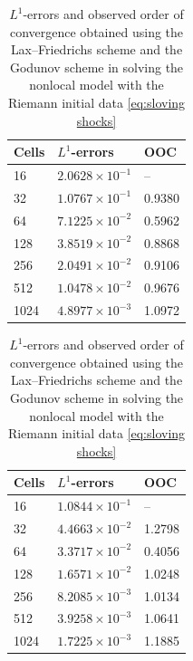 \begin{table}[H]
    \centering
    \begin{minipage}{0.45\textwidth}
        \centering
        \begin{tabular}{ |p{1.5cm}||p{2.2cm}| |p{1.5cm}| }
            \hline
            \textbf{Cells } & $L^{1}$-\textbf{errors} & \textbf{OOC} \\
            \hline
            16              & $2.0628 \times 10^{-1}$ & --           \\
            32              & $1.0767 \times 10^{-1}$ & 0.9380       \\
            64              & $7.1225 \times 10^{-2}$ & 0.5962       \\
            128             & $3.8519 \times 10^{-2}$ & 0.8868       \\
            256             & $2.0491 \times 10^{-2}$ & 0.9106       \\
            512             & $1.0478 \times 10^{-2}$ & 0.9676       \\
            1024            & $4.8977 \times 10^{-3}$ & 1.0972       \\
            \hline
        \end{tabular}
        \caption*{(a) Lax--Friedrichs scheme}
    \end{minipage}
    \hfill
    \begin{minipage}{0.5\textwidth}
        \centering
        \begin{tabular}{ |p{1.5cm}||p{2.2cm}| |p{1.5cm}| }
            \hline
            \textbf{Cells } & $L^{1}$-\textbf{errors} & \textbf{OOC} \\
            \hline
            16              & $1.0844 \times 10^{-1}$ & --           \\
            32              & $4.4663 \times 10^{-2}$ & 1.2798       \\
            64              & $3.3717 \times 10^{-2}$ & 0.4056       \\
            128             & $1.6571 \times 10^{-2}$ & 1.0248       \\
            256             & $8.2085 \times 10^{-3}$ & 1.0134       \\
            512             & $3.9258 \times 10^{-3}$ & 1.0641       \\
            1024            & $1.7225 \times 10^{-3}$ & 1.1885       \\
            \hline
        \end{tabular}
        \caption*{(b) Godunov scheme}
    \end{minipage}

    \caption{$L^{1}$-errors and observed order of convergence obtained using the Lax--Friedrichs scheme and the Godunov scheme in solving the nonlocal model with the Riemann initial data \eqref{eq:sloving shocks}}
    \label{tab:table_5}
\end{table}



